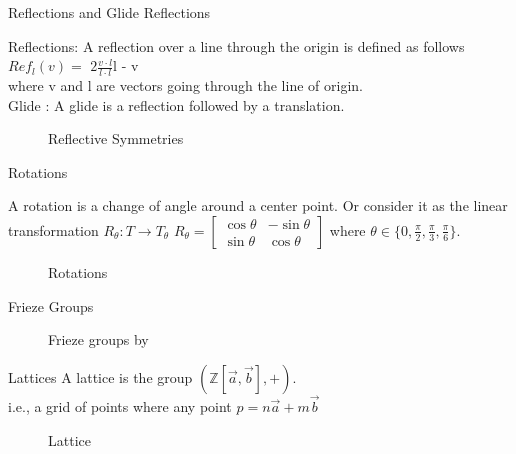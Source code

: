 \documentclass{beamer}
\begin{document}
\begin{frame}{Reflections and Glide Reflections}
    \begin{center}  
        Reflections: A reflection over a line through the origin is defined as follows\\
        $Ref_l(v) =$ \(2\frac{v \cdot l}{l \cdot l}\)l - v\\ where v and l are vectors going through the line of origin.\\ 
        Glide : A glide is a reflection followed by a translation.  \cite{Angela:2023}
    \end{center}
    \begin{figure}
        \centering
        
        \caption{Reflective Symmetries}
        \label{fig:symmetries}
    \end{figure}
\end{frame}

\begin{frame}{Rotations}
    \begin{center}
        A rotation is a change of angle around a center point.
        Or consider it as the linear transformation $R_\theta:T\rightarrow T_\theta$ 
        $R_\theta = \begin{bmatrix}
            \cos\theta & -\sin\theta\\
            \sin\theta & \cos\theta
        \end{bmatrix}$ 
        where $\theta \in \{0,\frac{\pi}{2},\frac{\pi}{3},\frac{\pi}{6}\}.$  \cite{Angela:2023}
    \end{center}
    \begin{figure}
        \centering
        
        \caption{Rotations}
        \label{fig:enter-label}
    \end{figure}
\end{frame}

\begin{frame}{Frieze Groups}
    \begin{figure}
        \centering
        
        \caption{Frieze groups by \cite{Tomruen:2015}}
        \label{fig:Freize}
    \end{figure}
\end{frame}

\begin{frame}{Lattices}
        A lattice is the group $(\mathbb{Z}[\Vec{a},\Vec{b}],+).$\\
        i.e., a grid of points where any point $p = n\Vec{a} +m\Vec{b}$ 
    \begin{figure}
        \centering
        \scalebox{0.5}{}
        \caption{Lattice}
        \label{fig:enter-label}
    \end{figure}
\end{frame}
\end{document}
